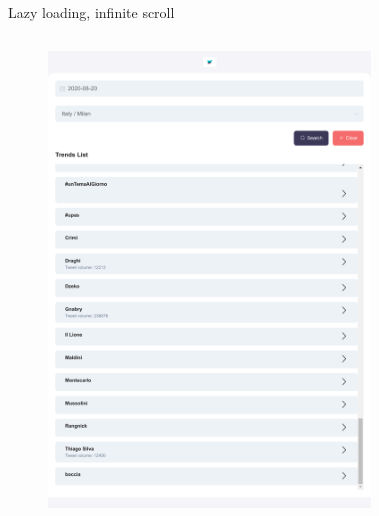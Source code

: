 \documentclass[xcolor=svgnames, aspectratio=169]{beamer}
\begin{document}
\begin{frame}{Lazy loading, infinite scroll}
    \begin{columns}[t]
        \vspace*{-12pt}
        \begin{figure}[H]
            \centering
            \includegraphics[width=0.475\paperwidth,height=0.7\paperheight,keepaspectratio]{Immagini/FrontEnd_TrendrApp_Scelta_Location_Paese_City_Risultati_Scroll.pdf}
        \end{figure}
        \vspace*{-12pt}
        \begin{figure}[H]
            \centering

\end{figure}
\end{columns}
\end{frame}
\end{document}
